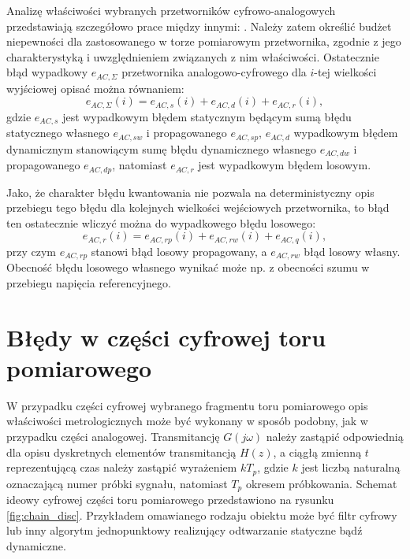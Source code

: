 Analizę właściwości wybranych przetworników cyfrowo-analogowych przedstawiają szczegółowo prace między innymi: \cite{jakubiec_system, sienkowski_adc, sienkowski_kwant, arpaia_deltasigma}. Należy zatem określić budżet niepewności dla zastosowanego w torze pomiarowym przetwornika, zgodnie z jego charakterystyką i uwzględnieniem związanych z nim właściwości. Ostatecznie błąd wypadkowy $e_{AC,\Sigma}$ przetwornika analogowo-cyfrowego dla $i$-tej wielkości wyjściowej opisać można równaniem:
\begin{equation}
e_{AC,\Sigma} \left( i \right) = e_{AC,s} \left( i \right) + e_{AC,d} \left( i \right) + e_{AC,r} \left( i \right) \label{eq:adc_outerr},
\end{equation}
gdzie $e_{AC,s}$ jest wypadkowym błędem statycznym będącym sumą błędu statycznego własnego $e_{AC,sw}$ i propagowanego $e_{AC,sp}$, $e_{AC,d}$ wypadkowym błędem dynamicznym stanowiącym sumę błędu dynamicznego własnego $e_{AC,dw}$ i propagowanego $e_{AC,dp}$, natomiast $e_{AC,r}$ jest wypadkowym błędem losowym.

Jako, że charakter błędu kwantowania nie pozwala na deterministyczny opis przebiegu tego błędu dla kolejnych wielkości wejściowych przetwornika, to błąd ten ostatecznie wliczyć można do wypadkowego błędu losowego:
\begin{equation}
e_{AC,r} \left( i \right) = e_{AC,rp} \left( i \right) + e_{AC,rw} \left( i \right) + e_{AC,q} \left( i \right) \label{eq:adc_rerr},
\end{equation}
przy czym $e_{AC,rp}$ stanowi błąd losowy propagowany, a $e_{AC,rw}$ błąd losowy własny. Obecność błędu losowego własnego wynikać może np. z obecności szumu w przebiegu napięcia referencyjnego.

\section{Błędy w części cyfrowej toru pomiarowego}

W przypadku części cyfrowej wybranego fragmentu toru pomiarowego opis właściwości metrologicznych może być wykonany w sposób podobny, jak w przypadku części analogowej. Transmitancję $G(j\omega)$ należy zastąpić odpowiednią dla opisu dyskretnych elementów transmitancją $H(z)$, a ciągłą zmienną $t$ reprezentującą czas należy zastąpić wyrażeniem $kT_{p}$, gdzie $k$ jest liczbą naturalną oznaczającą numer próbki sygnału, natomiast $T_{p}$ okresem próbkowania. Schemat ideowy cyfrowej części toru pomiarowego przedstawiono na rysunku \ref{fig:chain_disc}. Przykładem omawianego rodzaju obiektu może być filtr cyfrowy lub inny algorytm jednopunktowy realizujący odtwarzanie statyczne bądź dynamiczne.

